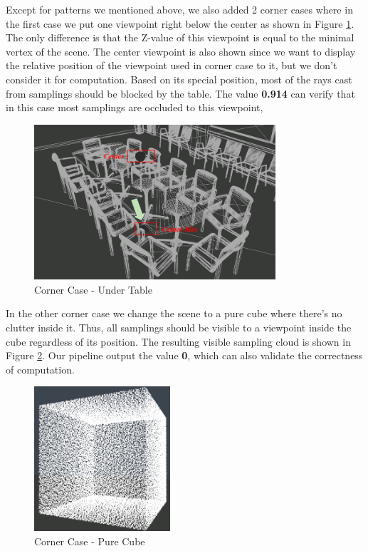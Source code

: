 \documentclass[11pt, a4paper,oneside,chapterprefix=false]{scrbook}
\begin{document}
\vspace{10pt}

Except for patterns we mentioned above, we also added 2 corner cases where in the first case we put one viewpoint right below the center as shown in Figure \ref{fig:corner case under table}. The only difference is that the Z-value of this viewpoint is equal to the minimal vertex of the scene. The center viewpoint is also shown since we want to display the relative position of the viewpoint used in corner case to it, but we don't consider it for computation. Based on its special position, most of the rays cast from samplings should be blocked by the table. The value \textbf{0.914} can verify that in this case most samplings are occluded to this viewpoint, 

\begin{figure}[H]
    \centering
    \includegraphics*[width=0.8\textwidth]{figures/edge case-under table.png}
    \caption{Corner Case - Under Table}
    \label{fig:corner case under table}
\end{figure}

In the other corner case we change the scene to a pure cube where there's no clutter inside it. Thus, all samplings should be visible to a viewpoint inside the cube regardless of its position. The resulting visible sampling cloud is shown in Figure \ref{fig:corner case pure cube}. Our pipeline output the value \textbf{0}, which can also validate the correctness of computation. 

\vspace{10pt}

\begin{figure}[H]
    \centering
    \includegraphics*[width=0.45\textwidth]{figures/cube with all samples.png}
    \caption{Corner Case - Pure Cube}
    \label{fig:corner case pure cube}
\end{figure}
\end{document}
